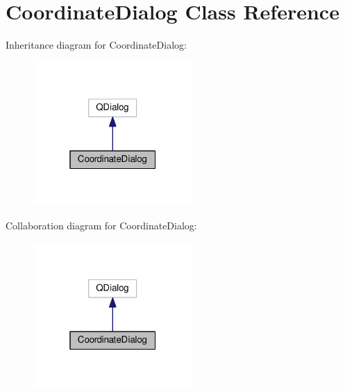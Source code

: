 \hypertarget{classCoordinateDialog}{}\section{Coordinate\+Dialog Class Reference}
\label{classCoordinateDialog}


Inheritance diagram for Coordinate\+Dialog\+:
\nopagebreak
\begin{figure}[H]
\begin{center}
\leavevmode
\includegraphics[width=172pt]{classCoordinateDialog__inherit__graph}
\end{center}
\end{figure}


Collaboration diagram for Coordinate\+Dialog\+:
\nopagebreak
\begin{figure}[H]
\begin{center}
\leavevmode
\includegraphics[width=172pt]{classCoordinateDialog__coll__graph}
\end{center}
\end{figure}
